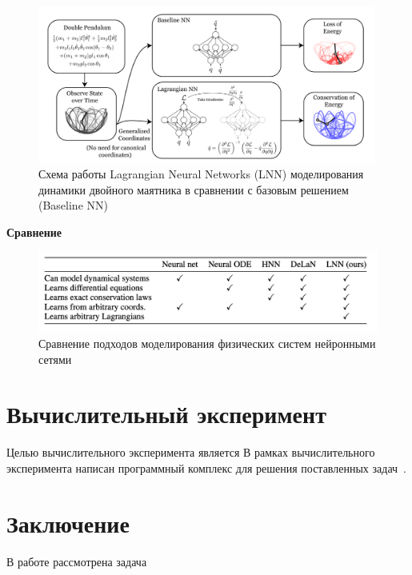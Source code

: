 \documentclass[12pt]{article}
\begin{document}
	\begin{figure}[h]
		\centering
		\includegraphics[width=0.99\textwidth]{lnn.png}
		\caption{Схема работы Lagrangian Neural Networks (LNN) моделирования динамики двойного маятника в сравнении с базовым решением (Baseline NN)}
	\end{figure}


	\textbf{Сравнение}
		\begin{figure}[h]
			\centering
			\includegraphics[width=1.05\textwidth]{comparison.png}
			\caption{Сравнение подходов моделирования физических систем нейронными сетями}
		\end{figure}
	

	
	\section{Вычислительный эксперимент}
	Целью вычислительного эксперимента является 
	В рамках вычислительного эксперимента написан программный комплекс для решения поставленных задач~\cite{source_code}.

	


	\section{Заключение}
	В работе рассмотрена задача 
	
	
		
	
	
\end{document}
